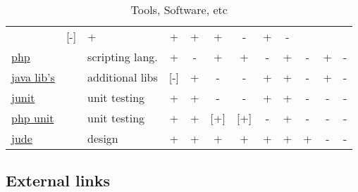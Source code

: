\begin{table}[htbp]
\begin{tabular}[t]{lll|cc|ccccccc|}
    & 
    [-]  %
    &
    + %
    &
    + %
    &
    + %
    &
    + %
    & 
    - %
    &
    + %
    &
    - %
    \\
    \href{https://www.php.net}{php}
    &
    & 
    scripting lang. %
    & 
    +  %
    & 
    -  %
    &
    + %
    &
    + %
    &
    - %
    &
    + %
    & 
    - %
    &
    + %
    &
    - %
    \\
    \href{http://www.informatik.uni-kiel.de/~java}{java lib's}
    &
    & 
    additional libs %
    & 
    [-] %
    & 
    +  %
    &
    - %
    &
    - %
    &
    + %
    &
    + %
    & 
    - %
    &
    + %
    &
    - %
    \\
    \href{}{junit}
    &
    &
    unit testing
    & 
    +  %
    & 
    +  %
    &
    - %
    &
    - %
    &
    + %
    &
    + %
    & 
    - %
    &
    - %
    &
    - %
    \\
    \href{http://www.sebastian-bergmann.de/en/phpunit.php}{php unit} 
    &
    &
    unit testing
    & 
    +  %
    & 
    +  %
    &
    [+] %
    &
    [+] %
    &
    - %
    &
    + %
    & 
    - %
    &
    - %
    &
    - %
    \\
    \href{https://www.esm.jp/jude-web/en/index.html}{jude}
    &
    & 
    design %
    & 
    +  %
    & 
    +  %
    &
    + %
    &
    + %
    &
    + %
    &
    + %
    & 
    + %
    &
    - %
    &
    - %
    \\
  \end{tabular}
  \caption{Tools, Software, etc}
  \label{tab:tools}
\end{table}

\subsection*{External links}

